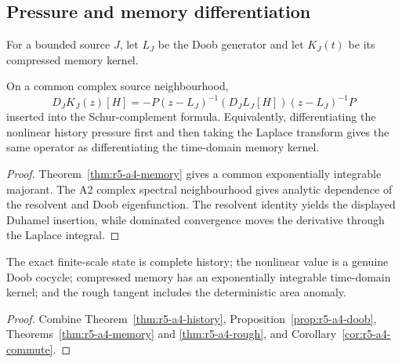 \subsection{Pressure and memory differentiation}

For a bounded source \(J\), let \(L_J\) be the Doob generator and let
\(K_J(t)\) be its compressed memory kernel.

\begin{corollary}
\label{cor:r5-a4-commute}
On a common complex source neighbourhood,
\[
 D_J\widehat K_J(z)[H]
 =
 -P(z-L_J)^{-1}(D_JL_J[H])
   (z-L_J)^{-1}P
\]
inserted into the Schur-complement formula.  Equivalently, differentiating
the nonlinear history pressure first and then taking the Laplace transform
gives the same operator as differentiating the time-domain memory kernel.
\end{corollary}

\begin{proof}
Theorem~\ref{thm:r5-a4-memory} gives a common exponentially integrable
majorant.  The A2 complex spectral neighbourhood gives analytic dependence
of the resolvent and Doob eigenfunction.  The resolvent identity yields the
displayed Duhamel insertion, while dominated convergence moves the derivative
through the Laplace integral.
\end{proof}

\begin{theorem}
\label{thm:r5-a4-main}
The exact finite-scale state is complete history; the nonlinear value is a
genuine Doob cocycle; compressed memory has an exponentially integrable
time-domain kernel; and the rough tangent includes the deterministic area
anomaly.
\end{theorem}

\begin{proof}
Combine Theorem~\ref{thm:r5-a4-history},
Proposition~\ref{prop:r5-a4-doob},
Theorems~\ref{thm:r5-a4-memory} and \ref{thm:r5-a4-rough}, and
Corollary~\ref{cor:r5-a4-commute}.
\end{proof}
